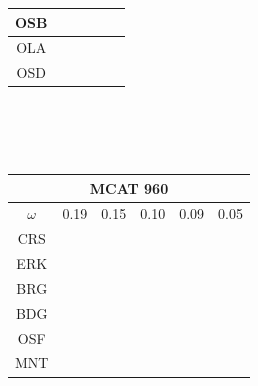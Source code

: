 \documentclass[12pt]{article}
\begin{document}
\begin{landscape}
\begin{figure}
\begin{minipage}[c]{0.3\textwidth}
\begin{tabular}{|c|c|c|c|c|c|}
        OSB&\cellcolor[HTML]{FF7F00}&\cellcolor[HTML]{4DAF4A}&\cellcolor[HTML]{984EA3}&\cellcolor[HTML]{984EA3}&\cellcolor[HTML]{984EA3}\\ \hline %
        OLA&\cellcolor[HTML]{FF7F00}&\cellcolor[HTML]{4DAF4A}&\cellcolor[HTML]{984EA3}&\cellcolor[HTML]{984EA3}&\cellcolor[HTML]{984EA3}\\ \hline %
        OSD&\cellcolor[HTML]{FFFF33}&\cellcolor[HTML]{984EA3}&\cellcolor[HTML]{FF7F00}&\cellcolor[HTML]{FF7F00}&\cellcolor[HTML]{FF7F00}\\ \hline %
\end{tabular}\\$~$\\$~$\\
\begin{tabular}{|c|c|c|c|c|c|}%
         \hline \multicolumn{6}{|c|}{MCAT 960} \\ \hline
         $\omega$&0.19&0.15&0.10&0.09&0.05\\ \hline %
        CRS&\cellcolor[HTML]{E41A1C}&\cellcolor[HTML]{E41A1C}&\cellcolor[HTML]{E41A1C}&\cellcolor[HTML]{E41A1C}&\cellcolor[HTML]{E41A1C}\\ \hline %
        ERK&\cellcolor[HTML]{E41A1C}&\cellcolor[HTML]{E41A1C}&\cellcolor[HTML]{E41A1C}&\cellcolor[HTML]{E41A1C}&\cellcolor[HTML]{E41A1C}\\ \hline %
        BRG&\cellcolor[HTML]{E41A1C}&\cellcolor[HTML]{E41A1C}&\cellcolor[HTML]{E41A1C}&\cellcolor[HTML]{377EB8}&\cellcolor[HTML]{377EB8}\\ \hline %
        BDG&\cellcolor[HTML]{377EB8}&\cellcolor[HTML]{377EB8}&\cellcolor[HTML]{377EB8}&\cellcolor[HTML]{377EB8}&\cellcolor[HTML]{377EB8}\\ \hline %
        OSF&\cellcolor[HTML]{4DAF4A}&\cellcolor[HTML]{377EB8}&\cellcolor[HTML]{377EB8}&\cellcolor[HTML]{4DAF4A}&\cellcolor[HTML]{377EB8}\\ \hline %
        MNT&\cellcolor[HTML]{4DAF4A}&\cellcolor[HTML]{4DAF4A}&\cellcolor[HTML]{377EB8}&\cellcolor[HTML]{4DAF4A}&\cellcolor[HTML]{4DAF4A}\\ \hline %

\end{tabular}
\end{minipage}
\end{figure}
\end{landscape}
\end{document}
